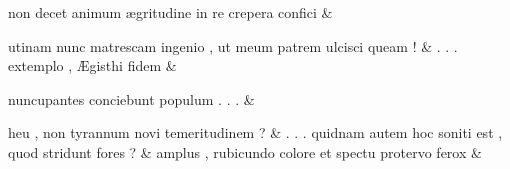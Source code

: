 \documentclass[12pt,onecolumn,twoside,a4paper]{memoir}
\begin{document}
\begin{pairs}
\begin{Leftside}
                              non
                              decet
                              animum
                              ægritudine
                              in
                              re
                              crepera
                              confici \&
                         \stanza {}
                     
                              utinam
                              nunc
                              matrescam
                              ingenio
                              ,
                              ut
                              meum
                              patrem
                              ulcisci
                              queam
                              ! \&
                         \stanza {}.
                              .
                              .
                              extemplo
                              ,
                              Ægisthi
                              fidem & 
                     
                              nuncupantes
                              conciebunt
                              populum
                              .
                              .
                              . \&
                         \stanza {}
                     
                              heu
                              ,
                              non
                              tyrannum
                              novi
                              temeritudinem
                              ? \&
                         \stanza {}
                     .
                              .
                              .
                              quidnam
                              autem
                              hoc
                              soniti
                              est
                              ,
                              quod
                              stridunt
                              fores
                              ? \&
                         \stanza {}
                     amplus
                              ,
                              rubicundo
                              colore
                              et
                              spectu
                              protervo
                              ferox \&
                         \stanza {}
                     

\end{Leftside}
\end{pairs}
\end{document}
